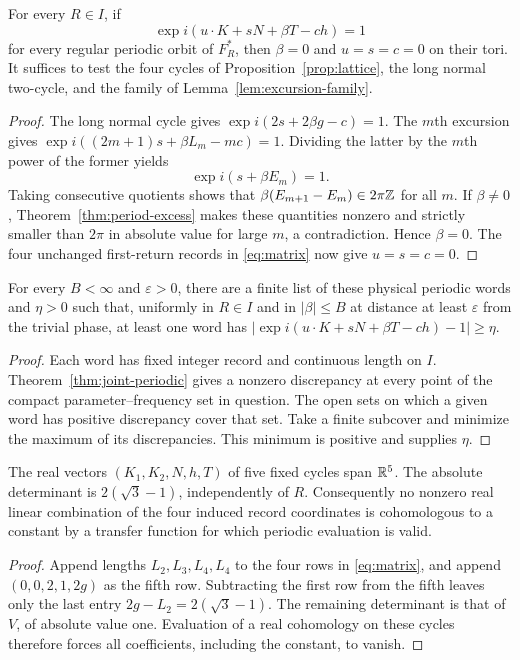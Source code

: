 \begin{theorem}\label{thm:joint-periodic}
For every $R\in I$, if
\begin{equation}\label{eq:joint-periodic-phase}
 \exp i(u\cdot K+sN+\beta T-ch)=1
\end{equation}
for every regular periodic orbit of $F_R^*$, then
$\beta=0$ and $u=s=c=0$ on their tori. It suffices to test the four
cycles of Proposition~\ref{prop:lattice}, the long normal two-cycle,
and the family of Lemma~\ref{lem:excursion-family}.
\end{theorem}
\begin{proof}
The long normal cycle gives $\exp i(2s+2\beta g-c)=1$.
The $m$th excursion gives
$\exp i((2m+1)s+\beta L_m-mc)=1$. Dividing the latter by the
$m$th power of the former yields
\[
                    \exp i(s+\beta E_m)=1.
\]
Taking consecutive quotients shows that
$\beta(E_{m+1}-E_m)\in2\pi\mathbb Z$ for all $m$. If $\beta\ne0$,
Theorem~\ref{thm:period-excess} makes these quantities nonzero and
strictly smaller than $2\pi$ in absolute value for large $m$, a
contradiction. Hence $\beta=0$. The four unchanged first-return
records in \eqref{eq:matrix} now give $u=s=c=0$.
\end{proof}

\begin{corollary}
\label{cor:compact-periodic}
For every $B<\infty$ and $\varepsilon>0$, there are a finite list of
these physical periodic words and $\eta>0$ such that, uniformly in
$R\in I$ and in $|\beta|\le B$ at distance at least $\varepsilon$
from the trivial phase, at least one word has
$|\exp i(u\cdot K+sN+\beta T-ch)-1|\ge\eta$.
\end{corollary}
\begin{proof}
Each word has fixed integer record and continuous length on $I$.
Theorem~\ref{thm:joint-periodic} gives a nonzero discrepancy at every
point of the compact parameter--frequency set in question. The open
sets on which a given word has positive discrepancy cover that set.
Take a finite subcover and minimize the maximum of its discrepancies.
This minimum is positive and supplies $\eta$.
\end{proof}

\begin{corollary}\label{cor:real-period-rank}
The real vectors $(K_1,K_2,N,h,T)$ of five fixed cycles span $\mathbb R^5$.
The absolute determinant is $2(\sqrt3-1)$, independently of $R$.
Consequently no nonzero real linear combination of the four induced
record coordinates is cohomologous to a constant by a transfer
function for which periodic evaluation is valid.
\end{corollary}
\begin{proof}
Append lengths $L_2,L_3,L_4,L_4$ to the four rows in
\eqref{eq:matrix}, and append $(0,0,2,1,2g)$ as the fifth row.
Subtracting the first row from the fifth leaves only the last entry
$2g-L_2=2(\sqrt3-1)$. The remaining determinant is that of $V$,
of absolute value one. Evaluation of a real cohomology on these
cycles therefore forces all coefficients, including the constant,
to vanish.
\end{proof}


